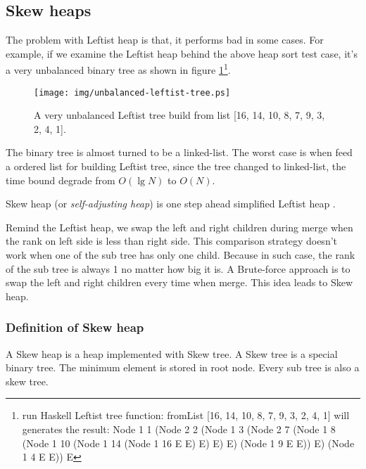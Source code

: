 \documentclass{article}
\begin{document}


\subsection{Skew heaps}
\label{skew-heap}

The problem with Leftist heap is that, it performs bad in some cases.
For example, if we examine the Leftist heap behind the above heap
sort test case, it's a very unbalanced binary tree as shown in figure
\ref{fig:unbalanced-leftist-tree}\footnote{run Haskell Leftist tree
function: fromList [16, 14, 10, 8, 7, 9, 3, 2, 4, 1] will generates
the result: Node 1 1 (Node 2 2 (Node 1 3 (Node 2 7 (Node 1 8 (Node 1 10 (Node 1 14 (Node 1 16 E E) E) E) E) (Node 1 9 E E)) E) (Node 1 4 E E)) E}.

\begin{figure}[htbp]
   \begin{center}
   	  \texttt{[image: img/unbalanced-leftist-tree.ps]}
    \caption{A very unbalanced Leftist tree build from list [16, 14, 10, 8, 7, 9, 3, 2, 4, 1].} \label{fig:unbalanced-leftist-tree}
   \end{center}
\end{figure}

The binary tree is almost turned to be a linked-list. The worst case
is when feed a ordered list for building Leftist tree, since the
tree changed to linked-list, the time bound degrade from $O(\lg N)$
to $O(N)$.

Skew heap (or {\em self-adjusting heap}) is one step ahead simplified Leftist heap \cite{wiki-skew-heap} \cite{self-adjusting-heaps}.

Remind the Leftist heap, we swap the left and right children during merge
when the rank on left side is less than right side. This comparison strategy
doesn't work when one of the sub tree has only one child. Because
in such case, the rank of the sub tree is always 1 no matter how
big it is. A Brute-force approach is to swap the left and right children
every time when merge. This idea leads to Skew heap.

\subsubsection{Definition of Skew heap}

A Skew heap is a heap implemented with Skew tree. A Skew tree is a special
binary tree. The minimum element is stored in root node. Every sub tree is
also a skew tree.
\end{document}
